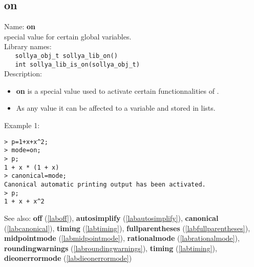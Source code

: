 \subsection{on}
\label{labon}
\noindent Name: \textbf{on}\\
\phantom{aaa}special value for certain global variables.\\[0.2cm]
\noindent Library names:\\
\verb|   sollya_obj_t sollya_lib_on()|\\
\verb|   int sollya_lib_is_on(sollya_obj_t)|\\[0.2cm]
\noindent Description: \begin{itemize}

\item \textbf{on} is a special value used to activate certain functionnalities 
   of \sollya.

\item As any value it can be affected to a variable and stored in lists.
\end{itemize}
\noindent Example 1: 
\begin{center}\begin{minipage}{15cm}\begin{Verbatim}[frame=single]
> p=1+x+x^2;
> mode=on;
> p;
1 + x * (1 + x)
> canonical=mode;
Canonical automatic printing output has been activated.
> p;
1 + x + x^2
\end{Verbatim}
\end{minipage}\end{center}
See also: \textbf{off} (\ref{laboff}), \textbf{autosimplify} (\ref{labautosimplify}), \textbf{canonical} (\ref{labcanonical}), \textbf{timing} (\ref{labtiming}), \textbf{fullparentheses} (\ref{labfullparentheses}), \textbf{midpointmode} (\ref{labmidpointmode}), \textbf{rationalmode} (\ref{labrationalmode}), \textbf{roundingwarnings} (\ref{labroundingwarnings}), \textbf{timing} (\ref{labtiming}), \textbf{dieonerrormode} (\ref{labdieonerrormode})
